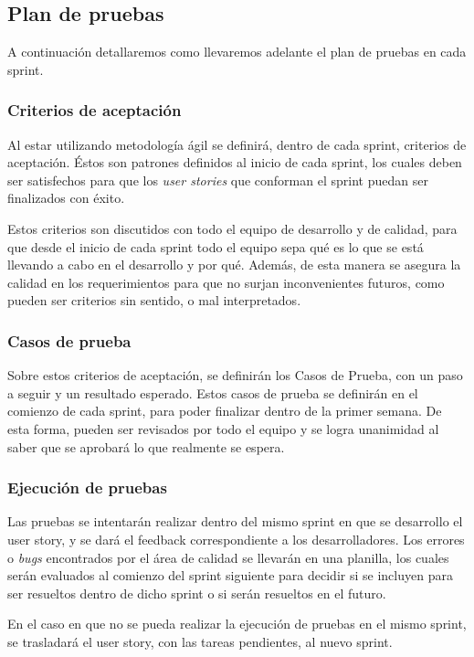 \subsection{Plan de pruebas}
A continuación detallaremos como llevaremos adelante el plan de pruebas en cada sprint.

\subsubsection{Criterios de aceptación}
Al estar utilizando  metodología ágil se definirá, dentro de cada sprint, criterios de aceptación.
Éstos son patrones definidos al inicio de cada sprint, los cuales deben ser satisfechos para que los \textit{user stories} que conforman el sprint puedan ser finalizados con éxito.

Estos criterios son discutidos con todo el equipo de desarrollo y de calidad, para que desde el inicio de cada sprint todo el equipo sepa qué es lo que se está llevando a cabo en el desarrollo y por qué. Además, de esta manera se asegura la calidad en los requerimientos para que no surjan inconvenientes futuros, como pueden ser criterios sin sentido, o mal interpretados.

\subsubsection{Casos de prueba}
Sobre estos criterios de aceptación, se definirán los Casos de Prueba, con un paso a seguir y un resultado esperado. Estos casos de prueba se definirán en el comienzo de cada sprint, para poder finalizar dentro de la primer semana.
De esta forma, pueden ser revisados por todo el equipo y se logra unanimidad al saber que se aprobará lo que realmente se espera.

\subsubsection{Ejecución de pruebas}
Las pruebas se intentarán realizar dentro del mismo sprint en que se desarrollo el user story, y se dará el feedback correspondiente a los desarrolladores.
Los errores o \textit{bugs} encontrados por el área de calidad se llevarán en una planilla, los cuales serán evaluados al comienzo del sprint siguiente para decidir si se incluyen para ser resueltos dentro de dicho sprint o si serán resueltos en el futuro.

En el caso en que no se pueda realizar la ejecución de pruebas en el mismo sprint, se trasladará el user story, con las tareas pendientes, al nuevo sprint.

